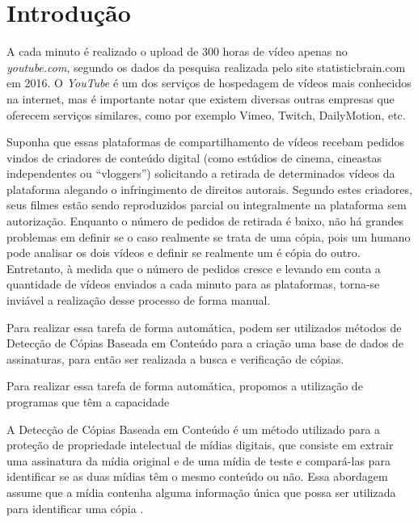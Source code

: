 \chapter{Introdução}
\label{chap:introducao}

A cada minuto é realizado o upload de 300 horas de vídeo apenas no \textit{youtube.com}, segundo os dados da pesquisa realizada pelo site statisticbrain.com em 2016. O \textit{YouTube} é um dos serviços de hospedagem de vídeos mais conhecidos na internet, mas é importante notar que existem diversas outras empresas que oferecem serviços similares, como por exemplo Vimeo, Twitch, DailyMotion, etc.

Suponha que essas plataformas de compartilhamento de vídeos recebam pedidos vindos de criadores de conteúdo digital (como estúdios de cinema, cineastas independentes ou ``vloggers'') solicitando a retirada de determinados vídeos da plataforma alegando o infringimento de direitos autorais. Segundo estes criadores, seus filmes estão sendo reproduzidos parcial ou integralmente na plataforma sem autorização. Enquanto o número de pedidos de retirada é baixo, não há grandes problemas em definir se o caso realmente se trata de uma cópia, pois um humano pode analisar os dois vídeos e definir se realmente um é cópia do outro. Entretanto, à medida que o número de pedidos cresce e levando em conta a quantidade de vídeos enviados a cada minuto para as plataformas, torna-se  inviável a realização desse processo de forma manual. 

Para realizar essa tarefa de forma automática, podem ser utilizados métodos de Detecção de Cópias Baseada em Conteúdo para a criação uma base de dados de assinaturas, para então ser realizada a busca e verificação de cópias.

Para realizar essa tarefa de forma automática, propomos a utilização de programas que têm a capacidade 

A Detecção de Cópias Baseada em Conteúdo é um método utilizado para a proteção de propriedade intelectual de mídias digitais, que consiste em extrair uma assinatura da mídia original e de uma mídia de teste e compará-las para identificar se as duas mídias têm o mesmo conteúdo ou não. Essa abordagem assume que a mídia contenha alguma informação única que possa ser utilizada para identificar uma cópia \citeauthor{kim2005spatiotemporal}. 




